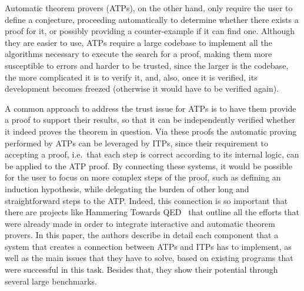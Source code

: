 Automatic theorem provers (ATPs), on the other hand,
only require the user to define a conjecture, proceeding automatically to
determine whether there exists a proof for it, or possibly providing a
counter-example if it can find one.
%
Although they are easier to use, ATPs require a large
codebase to implement all the algorithms necessary to execute the search for a proof,
making them more susceptible to errors and harder to be trusted, since the
larger is the codebase, the more complicated it is
to verify it, and, also, once it is verified, its development becomes freezed
(otherwise it would have to be verified again).

A common approach to address the trust issue for ATPs is to have them provide a
proof to support their results, so that it can be independently verified whether
it indeed proves the theorem in question.
%
Via these proofs the automatic proving performed by ATPs can be
leveraged by ITPs, since their requirement to accepting a proof, i.e.\ that each
step is correct according to its internal logic, can be applied to the ATP
proof.
%
By connecting these systems, it would be possible for the user to focus on more complex steps of the proof, such as defining an induction hypothesis, while delegating the burden of other long and straightforward steps to the ATP. Indeed, this
connection is so important that there are projects like Hammering Towards QED~\cite{hammering}
that outline all the efforts that were already made in order to integrate
interactive and automatic theorem provers. In this paper, the authors describe in detail each component that a system that creates a connection between ATPs and ITPs has to implement, as well as the main issues that they have to solve, based on existing programs that were successful in this task. Besides that, they show their potential through several large benchmarks. 

